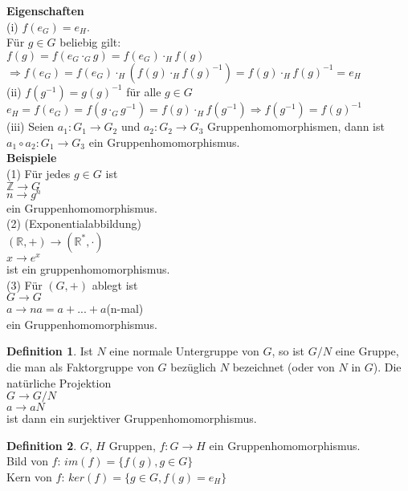\documentclass[12pt]{scrartcl}%
\theoremstyle{definition}
\newtheorem*{defn}{Definition}
\theoremstyle{remark}
\begin{document}
\textbf{Eigenschaften}\\
(i) $f(e_G)=e_H.$\\
Für $g\in G$ beliebig gilt:\\
$f(g)=f(e_{G}\cdot_{G}g)=f(e_G)\cdot_{H}f(g)$\\
$\Rightarrow f(e_G)=f(e_G)\cdot_{H}(f(g)\cdot_{H}f(g)^{-1})=f(g)\cdot_{H}f(g)^{-1}=e_H$\\
(ii) $f(g^{-1})=g(g)^{-1}$ für alle $g\in G$\\
$e_H=f(e_G)=f(g\cdot_G g^{-1})=f(g)\cdot_{H}f(g^{-1}) \Rightarrow f(g^{-1})=f(g)^{-1}$\\
(iii) Seien $a_1: G_1\rightarrow G_2$ und $a_2: G_2\rightarrow G_3$ Gruppenhomomorphismen, 
dann ist $a_1\circ a_2: G_1\rightarrow G_3$ ein Gruppenhomomorphismus.\\

\textbf{Beispiele}\\
(1) F{\"u}r jedes $g \in G$ ist\\
$\mathbb{Z} \rightarrow G$\\
$n \rightarrow g^n$\\
ein Gruppenhomomorphismus.\\
(2) (Exponentialabbildung) \\
$(\mathbb{R},+)\rightarrow(\mathbb{R}^*,\cdot)$\\
$x\rightarrow e^x$\\
ist ein gruppenhomomorphismus.\\
(3) F{\"u}r $(G,+)$ ablegt ist\\
$G\rightarrow G$\\
$a\rightarrow na = a+...+a$(n-mal)\\
ein Gruppenhomomorphismus.

\begin{defn}
Ist $N$ eine normale Untergruppe von $G$, so ist $G/N$ eine Gruppe, die man als Faktorgruppe von $G$ bezüglich $N$ bezeichnet (oder von $N$ in $G$).
Die natürliche Projektion\\
$G\rightarrow G/N$\\
$a\rightarrow aN$\\
ist dann ein surjektiver Gruppenhomomorphismus.
\end{defn}

\begin{defn}
$G$, $H$ Gruppen, $f: G\rightarrow H$ ein Gruppenhomomorphismus.\\
Bild von $f$: $im(f)=\{f(g),g\in G\}$\\
Kern von $f$: $ker(f)=\{g\in G,f(g)=e_H\}$
\end{defn}
\end{document}
